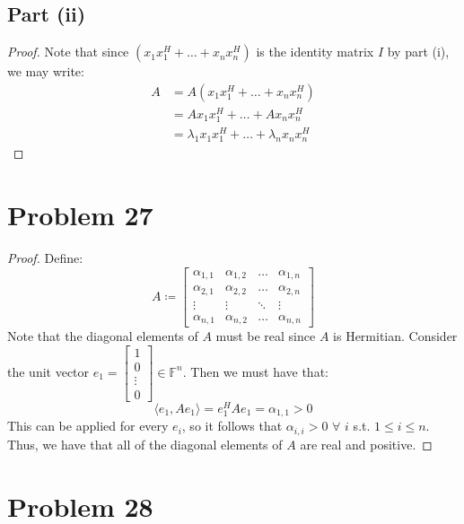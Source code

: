 \documentclass{article}
\begin{document}
\subsection*{Part (ii)}

\begin{proof}
Note that since $(x_{1}x_{1}^{H} + \dots + x_{n}x_{n}^{H})$ is the identity matrix $I$ by part (i), we may write:
\begin{align*}
A &= A(x_{1}x_{1}^{H} + \dots + x_{n}x_{n}^{H}) \\
&= Ax_{1}x_{1}^{H} + \dots + Ax_{n}x_{n}^{H} \\
&= \lambda_{1}x_{1}x_{1}^{H} + \dots + \lambda_{n}x_{n}x_{n}^{H}
\end{align*}
\end{proof}


\section*{Problem 27}

\begin{proof}
Define:
$$A \coloneqq \begin{bmatrix} \alpha_{1, 1} & \alpha_{1, 2} & \dots & \alpha_{1, n} \\
\alpha_{2, 1} & \alpha_{2, 2} & \dots & \alpha_{2, n} \\
\vdots & \vdots & \ddots & \vdots \\
\alpha_{n, 1} & \alpha_{n, 2} & \dots & \alpha_{n, n} \end{bmatrix}$$
Note that the diagonal elements of $A$ must be real since $A$ is Hermitian.
Consider the unit vector $e_1 = \begin{bmatrix} 1 \\ 0 \\ \vdots \\ 0 \end{bmatrix} \in \mathbb{F}^n$. Then we must have that:
$$\langle e_1, Ae_1 \rangle = e_1^{H}Ae_1 = \alpha_{1, 1} > 0$$
This can be applied for every $e_i$, so it follows that $\alpha_{i, i} > 0$ $\forall$ $i$ s.t. $1 \leq i \leq n$. Thus, we have that all of the diagonal elements of $A$ are real and positive.
\end{proof}


\section*{Problem 28}
\end{document}
